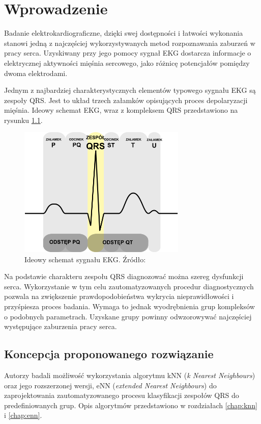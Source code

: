 \chapter{Wprowadzenie}
Badanie elektrokardiograficzne, dzięki swej dostępności i łatwości wykonania stanowi jedną z najczęściej wykorzystywanych metod rozpoznawania zaburzeń w pracy serca. Uzyskiwany przy jego pomocy sygnał EKG dostarcza informacje o elektrycznej aktywności mięśnia sercowego, jako różnicę potencjałów pomiędzy dwoma elektrodami.

Jednym z najbardziej charakterystycznych elementów typowego sygnału EKG są zespoły QRS. Jest to układ trzech załamków opisujących proces depolaryzacji mięśnia. Ideowy schemat EKG, wraz z kompleksem QRS przedstawiono na rysunku \ref{fig:qrs-complex}.


\begin{figure}[H]
	\centering
	\includegraphics[width=8cm]{img/qrs-complex}
	\caption{Ideowy schemat sygnału EKG. Źródło: \cite{qrs-wiki}}
	\label{fig:qrs-complex}
\end{figure}

Na podstawie charakteru zespołu QRS diagnozować można szereg dysfunkcji serca. Wykorzystanie w tym celu zautomatyzowanych procedur diagnostycznych pozwala na zwiększenie prawdopodobieństwa wykrycia nieprawidłowości i przyśpiesza proces badania. Wymaga to jednak wyodrębnienia grup kompleksów o podobnych parametrach. Uzyskane grupy powinny odwzorowywać najczęściej występujące zaburzenia pracy serca.

\section{Koncepcja proponowanego rozwiązanie}

Autorzy badali możliwość wykorzystania algorytmu kNN (\textit{k Nearest Neighbours}) oraz jego rozszerzonej wersji, eNN (\textit{extended Nearest Neighbours}) do zaprojektowania zautomatyzowanego procesu klasyfikacji zespołów QRS do predefiniowanych grup. Opis algorytmów przedstawiono w rozdziałach \ref{chap:knn} i \ref{chap:enn}.

